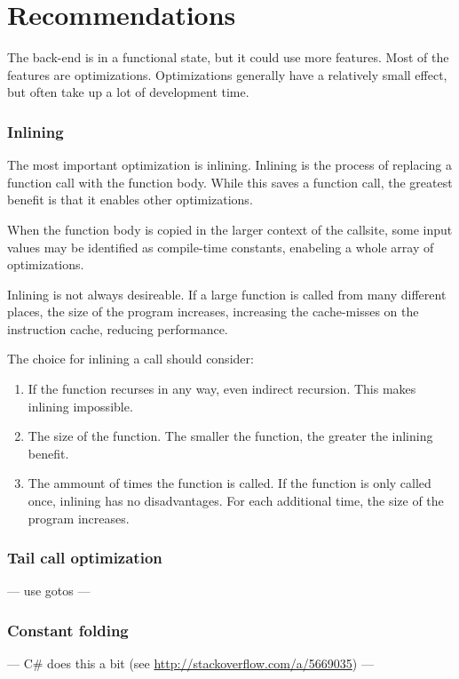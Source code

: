 \section{Recommendations}
The back-end is in a functional state, but it could use more features.
Most of the features are optimizations.
Optimizations generally have a relatively small effect, but often take up a lot of development time.

\subsubsection{Inlining}
The most important optimization is inlining\cite{inlining}.
Inlining is the process of replacing a function call with the function body.
While this saves a function call, the greatest benefit is that it enables other optimizations.

When the function body is copied in the larger context of the callsite, some input values may be identified as compile-time constants, enabeling a whole array of optimizations. 

Inlining is not always desireable.
If a large function is called from many different places, the size of the program increases, increasing the cache-misses on the instruction cache, reducing performance.

The choice for inlining a call should consider:
\begin{enumerate}
    \item If the function recurses in any way, even indirect recursion.
        This makes inlining impossible.
    \item The size of the function.
        The smaller the function, the greater the inlining benefit.
    \item The ammount of times the function is called.
        If the function is only called once, inlining has no disadvantages.
        For each additional time, the size of the program increases.
\end{enumerate}

\subsubsection{Tail call optimization}
--- use gotos ---

\subsubsection{Constant folding}
--- C\# does this a bit (see \url{http://stackoverflow.com/a/5669035}) ---

